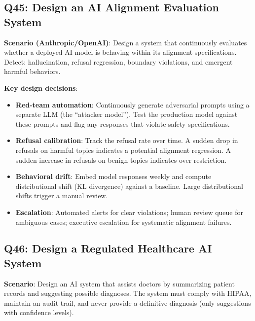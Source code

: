 \subsection{Q45: Design an AI Alignment Evaluation System}

\textbf{Scenario (Anthropic/OpenAI)}: Design a system that continuously evaluates whether a deployed AI model is behaving within its alignment specifications. Detect: hallucination, refusal regression, boundary violations, and emergent harmful behaviors.

\textbf{Key design decisions}:
\begin{itemize}[leftmargin=*]
    \item \textbf{Red-team automation}: Continuously generate adversarial prompts using a separate LLM (the ``attacker model''). Test the production model against these prompts and flag any responses that violate safety specifications.
    \item \textbf{Refusal calibration}: Track the refusal rate over time. A sudden drop in refusals on harmful topics indicates a potential alignment regression. A sudden increase in refusals on benign topics indicates over-restriction.
    \item \textbf{Behavioral drift}: Embed model responses weekly and compute distributional shift (KL divergence) against a baseline. Large distributional shifts trigger a manual review.
    \item \textbf{Escalation}: Automated alerts for clear violations; human review queue for ambiguous cases; executive escalation for systematic alignment failures.
\end{itemize}

\subsection{Q46: Design a Regulated Healthcare AI System}

\textbf{Scenario}: Design an AI system that assists doctors by summarizing patient records and suggesting possible diagnoses. The system must comply with HIPAA, maintain an audit trail, and never provide a definitive diagnosis (only suggestions with confidence levels).

